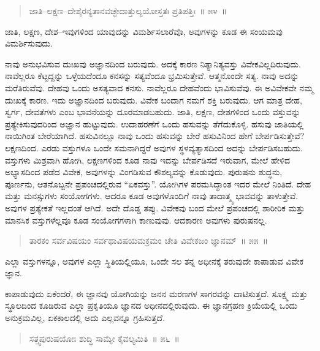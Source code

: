 \begin{verse}
ಜಾತಿ–ಲಕ್ಷಣ–ದೇಶೈರನ್ಯತಾನವಚ್ಛೇದಾತ್ತುಲ್ಯಯೋಸ್ತತಃ ಪ್ರತಿಪತ್ತಿಃ~॥ ೫೪~॥
\end{verse}

\vspace{-0.3cm}

ಜಾತಿ, ಲಕ್ಷಣ, ದೇಶ–ಇವುಗಳಿಂದ ಯಾವುದನ್ನು ವಿಮರ್ಶಿಸಲಾರೆವೊ, ಅವುಗಳನ್ನು ಕೂಡ ಈ ಸಂಯಮವು ವಿಮರ್ಶಿಸುವುದು. 

ನಾವು ಅನುಭವಿಸುವ ದುಃಖವು ಅಜ್ಞಾನದಿಂದ ಬರುವುದು. ಅದಕ್ಕೆ ಕಾರಣ ನಿತ್ಯಾನಿತ್ಯವಸ್ತು ವಿವೇಕವಿಲ್ಲದಿರುವುದು. ನಾವೆಲ್ಲರೂ ಕೆಟ್ಟದ್ದನ್ನು ಒಳ್ಳೆಯದೆಂದೂ ಕನಸನ್ನು ಸತ್ಯವೆಂದೂ ಭ್ರಮಿಸುತ್ತೇವೆ. ಆತ್ಮನೊಂದೇ ಸತ್ಯ. ನಾವು ಅದನ್ನು ಮರೆತಿರುವೆವು. ದೇಹವು ಒಂದು ಅಸತ್ಯವಾದ ಕನಸು. ನಾವೆಲ್ಲರೂ ದೇಹವೆಂದು ಭಾವಿಸುವೆವು. ಈ ಅವಿವೇಕವೇ ನಮ್ಮ ದುಃಖಕ್ಕೆ ಕಾರಣ. ಇದು ಅಜ್ಞಾನದಿಂದ ಬರುವುದು. ವಿವೇಕ ಬಂದಾಗ ನಮಗೆ ಶಕ್ತಿ ಬರುವುದು. ಆಗ ಮಾತ್ರ ದೇಹ, ಸ್ವರ್ಗ, ದೇವತೆಗಳು ಎಂಬ ಭಾವನೆಯನ್ನು ದೂರಮಾಡಬಹುದು. ಜಾತಿ, ಲಕ್ಷಣ, ದೇಶಗಳಿಂದ ಒಂದು ವಸ್ತುವನ್ನು ಪ್ರತ್ಯೇಕಿಸುವುದರಿಂದ ಅಜ್ಞಾನ ಹುಟ್ಟುವುದು. ಉದಾಹರಣೆಗೆ ಒಂದು ಹಸುವನ್ನು ತೆಗೆದುಕೊಳ್ಳಿ. ಹಸುವು ಜಾತಿಯಲ್ಲಿ ನಾಯಿಗಿಂತ ಬೇರೆಯಾಗಿದೆ. ಹಸುವಿನಲ್ಲೂ ನಾವು ಒಂದು ಹಸುವನ್ನು ಬೇರೆ ಹಸುವಿನಿಂದ ಹೇಗೆ ಬೇರ್ಪಡಿಸುತ್ತೇವೆ? ಲಕ್ಷಣದಿಂದ. ಎರಡು ವಸ್ತುಗಳೂ ಒಂದೇ ಸಮನಾಗಿದ್ದರೆ ಅವುಗಳ ಸ್ಥಳವ್ಯತ್ಯಾಸದಿಂದ ಅದನ್ನು ಬೇರ್ಪಡಿಸಬಹುದು. ವಸ್ತುಗಳು ಮಿಶ್ರವಾಗಿ ಹೋಗಿ, ಲಕ್ಷಣಗಳಿಂದ ಕೂಡ ನಾವು ಇದನ್ನು ಬೇರ್ಪಡಿಸದೆ ಇರುವಾಗ, ಮೇಲೆ ಹೇಳಿದ ಅಭ್ಯಾಸದಿಂದ ಪಡೆದ ವಿವೇಕ, ಅವುಗಳನ್ನು ವಿಂಗಡಿಸುವ ಕೌಶಲ್ಯವನ್ನು ಕೊಡುವುದು. ಪುರುಷನು ಶುದ್ಧನು, ಪೂರ್ಣನು, ಆತನೊಬ್ಬನೇ ಪ್ರಪಂಚದಲ್ಲಿರುವ “ಏಕವಸ್ತು”. ಯೋಗಿಗಳ ಪರಮಸಿದ್ಧಾಂತ ಇದರ ಮೇಲೆ ನಿಂತಿದೆ. ದೇಹ ಮತ್ತು ಮನಸ್ಸುಗಳು ಸಂಯೋಗಗಳು. ಆದರೂ ಕೂಡ ಅವುಗಳೊಂದಿಗೆ ನಾವು ತಾದಾತ್ಮ್ಯ ಭಾವವನ್ನು ತಾಳುತ್ತೇವೆ. ಅವುಗಳ ಪ್ರತ್ಯೇಕತೆ ಇಲ್ಲದಂತೆ ಆಗಿದೆ. ಅದೇ ದೊಡ್ಡ ತಪ್ಪು. ವಿವೇಕವು ಬಂದ ಮೇಲೆ ಪ್ರಪಂಚದಲ್ಲಿ ಶಾರೀರಿಕ ಮತ್ತು ಮಾನಸಿಕ ವಸ್ತುಗಳೆಲ್ಲವೂ ಕೂಡ ಸಂಯೋಗಗಳಾಗಿ ಕಾಣುವುವು. ಆದಕಾರಣ ಅವುಗಳು ಪುರುಷನಲ್ಲ. 

\vspace{-0.3cm}

\begin{verse}
ತಾರಕಂ ಸರ್ವವಿಷಯಂ ಸರ್ವಥಾವಿಷಯಮಕ್ರಮಂ ಚೇತಿ ವಿವೇಕಜಂ ಜ್ಞಾನಮ್​~॥ ೫೫~॥
\end{verse}

\vspace{-0.3cm}

ಎಲ್ಲಾ ವಸ್ತುಗಳನ್ನೂ, ಅವುಗಳ ಎಲ್ಲಾ ಸ್ಥಿತಿಯಲ್ಲಿಯೂ, ಒಂದೇ ಸಲ ತನ್ನ ಅಧೀನಕ್ಕೆ ತರುವುದೇ ಕಾಪಾಡುವ ವಿವೇಕ ಜ್ಞಾನ. 

ಕಾಪಾಡುವುದು ಏಕೆಂದರೆ, ಈ ಜ್ಞಾನವು ಯೋಗಿಯನ್ನು ಜನನ ಮರಣಗಳ ಸಾಗರವನ್ನು ದಾಟಿಸುತ್ತದೆ. ಸೂಕ್ಷ್ಮ ಮತ್ತು ಸ್ಥೂಲದಿಂದ ಕೂಡಿರುವ ಎಲ್ಲಾ ಪ್ರಕೃತಿಯೂ ಜ್ಞಾನದ ಅಧೀನದಲ್ಲಿರುವುದು. ಈ ಜ್ಞಾನಗ್ರಹಣ ಕ್ರಿಯೆಯಲ್ಲಿ ಒಂದು ಅನುಕ್ರಮವಿಲ್ಲ, ಏಕಕಾಲದಲ್ಲಿ ಅದು ಎಲ್ಲವನ್ನೂ ಗ್ರಹಿಸುತ್ತದೆ. 

\vspace{-0.3cm}

\begin{verse}
ಸತ್ತ್ವಪುರುಷಯೋಃ ಶುದ್ಧಿ ಸಾಮ್ಯೇ ಕೈವಲ್ಯಮಿತಿ~॥ ೫೬~॥
\end{verse}


